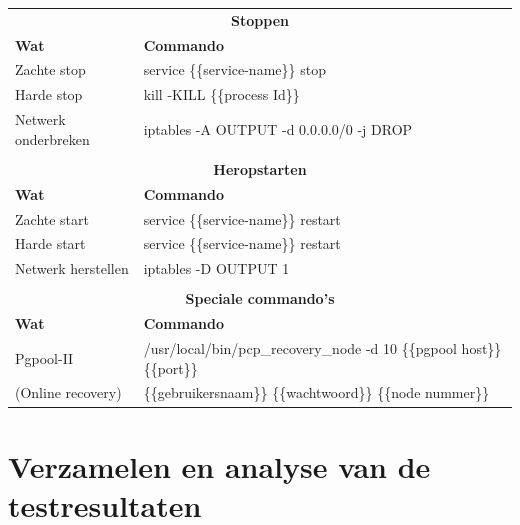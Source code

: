 \begin{table}[t]
	\centering
		\begin{tabular}{l|l}
			\multicolumn{2}{c}{\textbf{Stoppen}} \\
			\textbf{Wat} & \textbf{Commando} \\ 
			\hline
			Zachte stop & service \{\{service-name\}\} stop \\ 
			Harde stop & kill -KILL \{\{process Id\}\} \\ 
			Netwerk onderbreken & iptables -A OUTPUT -d 0.0.0.0/0 -j DROP  \\ 
			\multicolumn{2}{c}{} \\
			\multicolumn{2}{c}{\textbf{Heropstarten}} \\
			\textbf{Wat} & \textbf{Commando} \\ 
			\hline
			Zachte start & service \{\{service-name\}\} restart \\ 
			Harde start & service \{\{service-name\}\} restart \\ 
			Netwerk herstellen & iptables -D OUTPUT 1  \\ 
			\multicolumn{2}{c}{} \\
			\multicolumn{2}{c}{\textbf{Speciale commando's}} \\
			\textbf{Wat} & \textbf{Commando} \\ 
			\hline
			Pgpool-II & /usr/local/bin/pcp\_recovery\_node -d 10 \{\{pgpool host\}\} \{\{port\}\} \\
			\hspace*{0.5cm} (Online recovery) &  \hspace*{0.5cm} \{\{gebruikersnaam\}\} \{\{wachtwoord\}\}  \{\{node nummer\}\} \\
		\end{tabular} 
	\label{table:beschikbaarheidcommandos}
\end{table}

\section{Verzamelen en analyse van de testresultaten}
